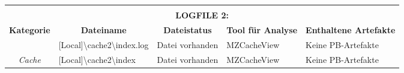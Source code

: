 \begin{appendices}
{\begin{landscape}
\begin{table}[h!]
{\begin{tabular}{cllll}
	\multicolumn{1}{l}{}                                                                                         &                                                                                                                                                                                                                     &                                                                                                   &                                                  &                                                                 \\
	\multicolumn{5}{c}{\textbf{LOGFILE 2:}}                                                                                                                                                                                                                                                                                                                                                                                                                                                                                                                     \\ \hline
	\multicolumn{1}{|c|}{\textbf{Kategorie}}                                                                     & \multicolumn{1}{c|}{\textbf{Dateiname}}                                                                                                                                                                             & \multicolumn{1}{c|}{\textbf{Dateistatus}}                                                         & \multicolumn{1}{c|}{\textbf{Tool für Analyse}}   & \multicolumn{1}{l|}{\textbf{Enthaltene Artefakte}}              \\ \hline
	\multicolumn{1}{|c|}{}                                                                                       & \multicolumn{1}{l|}{\cellcolor[HTML]{34CDF9}[Local]\textbackslash{}cache2\textbackslash{}index.log}                                                                                                                        & \multicolumn{1}{l|}{\cellcolor[HTML]{009901}Datei vorhanden}                                      & \multicolumn{1}{l|}{MZCacheView}            & \multicolumn{1}{l|}{\cellcolor[HTML]{F8A102}Keine PB-Artefakte} \\ \cline{2-5} 
	\multicolumn{1}{|c|}{\multirow{-2}{*}{\textit{Cache}}}                                                       & \multicolumn{1}{l|}{\cellcolor[HTML]{34CDF9}[Local]\textbackslash{}cache2\textbackslash{}index}                                                                                                                            & \multicolumn{1}{l|}{\cellcolor[HTML]{009901}Datei vorhanden}                                      & \multicolumn{1}{l|}{MZCacheView}            & \multicolumn{1}{l|}{\cellcolor[HTML]{F8A102}Keine PB-Artefakte} \\ \hline

\end{tabular}}
\end{table}
\end{landscape}}
\end{appendices}
